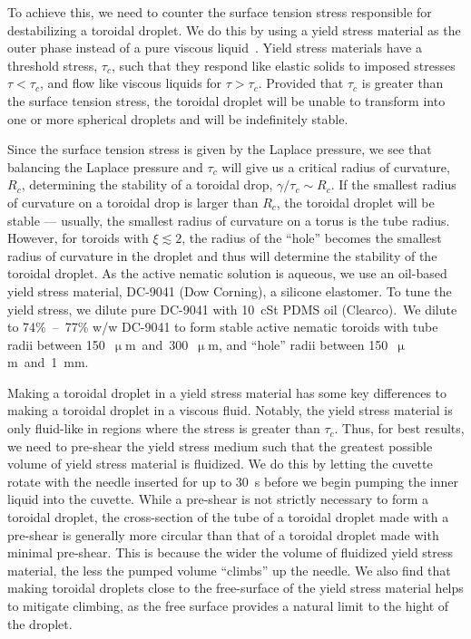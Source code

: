To achieve this, we need to counter the surface tension stress responsible for destabilizing a toroidal droplet.
We do this by using a yield stress material as the outer phase instead of a pure viscous liquid~\cite{RN47,RN258}.
Yield stress materials have a threshold stress, $\tau_c$, such that they respond like elastic solids to imposed stresses $\tau < \tau_c$, and flow like viscous liquids for $\tau > \tau_c$.
Provided that $\tau_c$ is greater than the surface tension stress, the toroidal droplet will be unable to transform into one or more spherical droplets and will be indefinitely stable.

Since the surface tension stress is given by the Laplace pressure, we see that balancing the Laplace pressure and $\tau_c$ will give us a critical radius of curvature, $R_c$, determining the stability of a toroidal drop, $\gamma/\tau_c \sim R_c$.
If the smallest radius of curvature on a toroidal drop is larger than $R_c$, the toroidal droplet will be stable --- usually, the smallest radius of curvature on a torus is the tube radius.
However, for toroids with $\xi \lesssim 2$, the radius of the ``hole'' becomes the smallest radius of curvature in the droplet and thus will determine the stability of the toroidal droplet.
As the active nematic solution is aqueous, we use an oil-based yield stress material, DC-9041 (Dow Corning), a silicone elastomer.
To tune the yield stress, we dilute pure DC-9041 with 10~cSt PDMS oil (Clearco).\
We dilute to 74\%~--~77\% w/w DC-9041 to form stable active nematic toroids with tube radii between 150~$\upmu$m~and~300~$\upmu$m, and ``hole'' radii between 150~$\upmu$m~and~1~mm.

Making a toroidal droplet in a yield stress material has some key differences to making a toroidal droplet in a viscous fluid.
Notably, the yield stress material is only fluid-like in regions where the stress is greater than $\tau_c$.
Thus, for best results, we need to pre-shear the yield stress medium such that the greatest possible volume of yield stress material is fluidized.
We do this by letting the cuvette rotate with the needle inserted for up to 30~s before we begin pumping the inner liquid into the cuvette.
While a pre-shear is not strictly necessary to form a toroidal droplet, the cross-section of the tube of a toroidal droplet made with a pre-shear is generally more circular than that of a toroidal droplet made with minimal pre-shear.
This is because the wider the volume of fluidized yield stress material, the less the pumped volume ``climbs'' up the needle.
We also find that making toroidal droplets close to the free-surface of the yield stress material helps to mitigate climbing, as the free surface provides a natural limit to the hight of the droplet.

